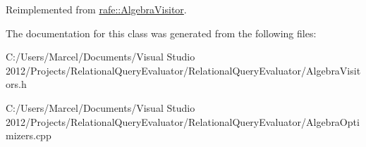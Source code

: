 Reimplemented from \hyperlink{classrafe_1_1_algebra_visitor_a1f8a7cae040f5918e562741a136bb096}{rafe\+::\+Algebra\+Visitor}.



The documentation for this class was generated from the following files\+:\begin{DoxyCompactItemize}
\item 
C\+:/\+Users/\+Marcel/\+Documents/\+Visual Studio 2012/\+Projects/\+Relational\+Query\+Evaluator/\+Relational\+Query\+Evaluator/Algebra\+Visitors.\+h\item 
C\+:/\+Users/\+Marcel/\+Documents/\+Visual Studio 2012/\+Projects/\+Relational\+Query\+Evaluator/\+Relational\+Query\+Evaluator/Algebra\+Optimizers.\+cpp\end{DoxyCompactItemize}
